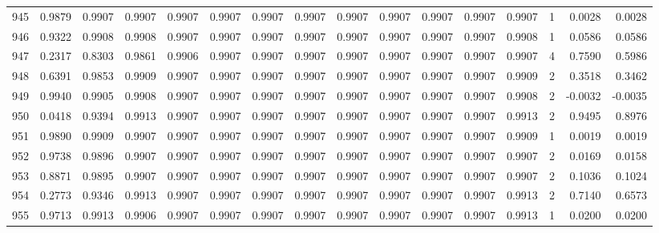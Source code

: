 \begin{tabular}{lrrrrrrrrrrrrrrr}
945 &      0.9879 &  0.9907 &  0.9907 &  0.9907 &  0.9907 &  0.9907 &  0.9907 &  0.9907 &  0.9907 &  0.9907 &   0.9907 &     0.9907 &      1 &                    0.0028 &                     0.0028 \\
946 &      0.9322 &  0.9908 &  0.9908 &  0.9907 &  0.9907 &  0.9907 &  0.9907 &  0.9907 &  0.9907 &  0.9907 &   0.9907 &     0.9908 &      1 &                    0.0586 &                     0.0586 \\
947 &      0.2317 &  0.8303 &  0.9861 &  0.9906 &  0.9907 &  0.9907 &  0.9907 &  0.9907 &  0.9907 &  0.9907 &   0.9907 &     0.9907 &      4 &                    0.7590 &                     0.5986 \\
948 &      0.6391 &  0.9853 &  0.9909 &  0.9907 &  0.9907 &  0.9907 &  0.9907 &  0.9907 &  0.9907 &  0.9907 &   0.9907 &     0.9909 &      2 &                    0.3518 &                     0.3462 \\
949 &      0.9940 &  0.9905 &  0.9908 &  0.9907 &  0.9907 &  0.9907 &  0.9907 &  0.9907 &  0.9907 &  0.9907 &   0.9907 &     0.9908 &      2 &                   -0.0032 &                    -0.0035 \\
950 &      0.0418 &  0.9394 &  0.9913 &  0.9907 &  0.9907 &  0.9907 &  0.9907 &  0.9907 &  0.9907 &  0.9907 &   0.9907 &     0.9913 &      2 &                    0.9495 &                     0.8976 \\
951 &      0.9890 &  0.9909 &  0.9907 &  0.9907 &  0.9907 &  0.9907 &  0.9907 &  0.9907 &  0.9907 &  0.9907 &   0.9907 &     0.9909 &      1 &                    0.0019 &                     0.0019 \\
952 &      0.9738 &  0.9896 &  0.9907 &  0.9907 &  0.9907 &  0.9907 &  0.9907 &  0.9907 &  0.9907 &  0.9907 &   0.9907 &     0.9907 &      2 &                    0.0169 &                     0.0158 \\
953 &      0.8871 &  0.9895 &  0.9907 &  0.9907 &  0.9907 &  0.9907 &  0.9907 &  0.9907 &  0.9907 &  0.9907 &   0.9907 &     0.9907 &      2 &                    0.1036 &                     0.1024 \\
954 &      0.2773 &  0.9346 &  0.9913 &  0.9907 &  0.9907 &  0.9907 &  0.9907 &  0.9907 &  0.9907 &  0.9907 &   0.9907 &     0.9913 &      2 &                    0.7140 &                     0.6573 \\
955 &      0.9713 &  0.9913 &  0.9906 &  0.9907 &  0.9907 &  0.9907 &  0.9907 &  0.9907 &  0.9907 &  0.9907 &   0.9907 &     0.9913 &      1 &                    0.0200 &                     0.0200 \\

\end{tabular}
